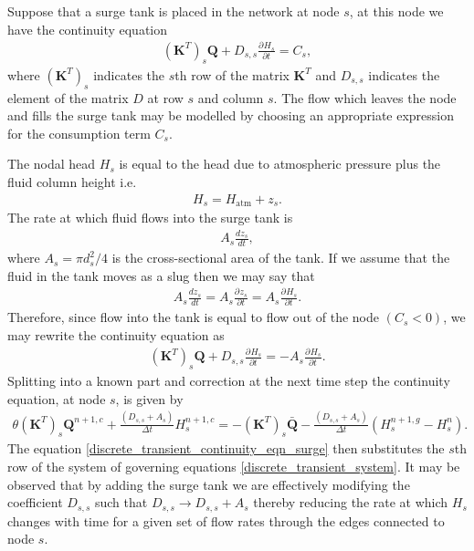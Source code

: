 \documentclass[12pt]{article}
\newcommand{\pardiv}[3]{\frac{\partial^{#1} #2}{\partial #3^{#1}}}
\begin{document}
Suppose that a surge tank is placed in the network at node $s$, at this node we have the continuity equation
\begin{align}
\left( \mathbf{K}^T \right)_s \mathbf{Q} + D_{s,s} \pardiv{}{H_s}{t} = C_s,
\end{align}
where $\left( \mathbf{K}^T \right)_s$ indicates the $s$th row of the matrix $\mathbf{K}^T$ and $D_{s,s}$ indicates the element of the matrix $D$ at row $s$ and column $s$. The flow which leaves the node and fills the surge tank may be modelled by choosing an appropriate expression for the consumption term $C_s$. 

The nodal head $H_s$ is equal to the head due to atmospheric pressure plus the fluid column height i.e.
\begin{align}
H_s = H_{\text{atm}} + z_s.
\end{align} 
The rate at which fluid flows into the surge tank is
\begin{align*}
A_s \frac{d z_s}{d t},
\end{align*}
where $A_s = \pi d_s^2 / 4$ is the cross-sectional area of the tank. If we assume that the fluid in the tank moves as a slug then we may say that
 \begin{align*}
A_s \frac{d z_s}{d t} = A_s \pardiv{}{z_s}{t} = A_s \pardiv{}{H_s}{t}.
\end{align*}
Therefore, since flow into the tank is equal to flow out of the node $(C_s < 0)$, we may rewrite the continuity equation as
\begin{align*}
\left( \mathbf{K}^T \right)_s \mathbf{Q} + D_{s,s} \pardiv{}{H_s}{t} = - A_s \pardiv{}{H_s}{t}.
\end{align*}
Splitting into a known part and correction at the next time step the continuity equation, at node $s$, is given by
\begin{align}\label{discrete_transient_continuity_eqn_surge}
\theta \left( \mathbf{K}^T \right)_s \mathbf{Q}^{n+1,c} + \frac{(D_{s,s} + A_s)}{\Delta t} H_s^{n+1,c} = - \left( \mathbf{K}^T \right)_s \bar{\mathbf{Q}} - \frac{(D_{s,s} + A_s)}{\Delta t} \left( H_s^{n+1,g} - H_s^{n} \right).
\end{align}
The equation \eqref{discrete_transient_continuity_eqn_surge} then substitutes the $s$th row of the system of governing equations \eqref{discrete_transient_system}. It may be observed that by adding the surge tank we are effectively modifying the coefficient $D_{s,s}$ such that $D_{s,s} \rightarrow D_{s,s} + A_s$ thereby reducing the rate at which $H_s$ changes with time for a given set of flow rates through the edges connected to node $s$. 
\end{document}
